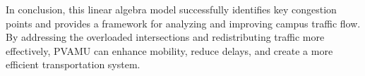 \documentclass{ximera}
\begin{document}
In conclusion, this linear algebra model successfully identifies key congestion points and provides a framework for analyzing and improving campus traffic flow. By addressing the overloaded intersections and redistributing traffic more effectively, PVAMU can enhance mobility, reduce delays, and create a more efficient transportation system.
\end{document}
